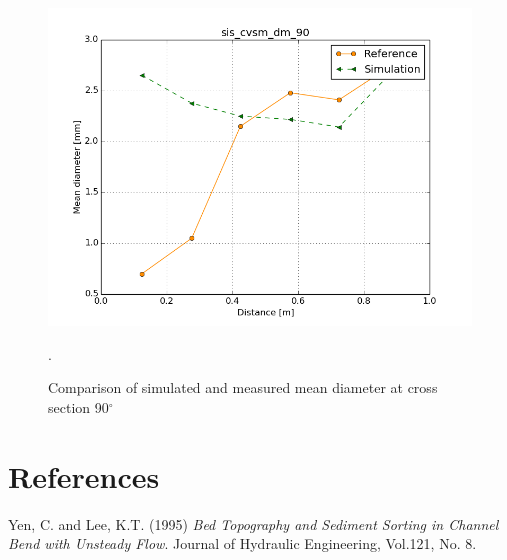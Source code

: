 \begin{figure} [!h]
\centering
\includegraphics[width=.96\textwidth]{sis_cvsm_dm_90.png}
 \caption{Comparison of simulated and measured mean diameter at cross section 90$^{\circ}$}.\label{fig:results3}
\end{figure}



\section{References}
%
Yen, C. and Lee, K.T. (1995) \textit{Bed Topography and Sediment Sorting in Channel Bend
with Unsteady Flow}. Journal of Hydraulic Engineering, Vol.121, No. 8.
